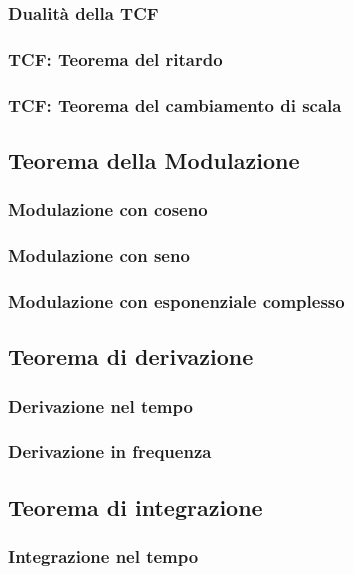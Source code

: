\documentclass[12pt,oneside,openany]{memoir}
\numberwithin{equation}{subsection}
\begin{document}
\newpage
\subsubsection{Dualit\`a della TCF}

\newpage
\subsubsection{TCF: Teorema del ritardo}

\newpage
\subsubsection{TCF: Teorema del cambiamento di scala}

\newpage
\subsection{Teorema della Modulazione}
\newpage
\subsubsection{Modulazione con coseno}
\newpage
\subsubsection{Modulazione con seno}
\newpage
\subsubsection{Modulazione con esponenziale complesso}

\newpage
\subsection{Teorema di derivazione}
\newpage
\subsubsection{Derivazione nel tempo}
\newpage
\subsubsection{Derivazione in frequenza}

\newpage
\subsection{Teorema di integrazione}
\newpage
\subsubsection{Integrazione nel tempo}
\newpage
\end{document}
